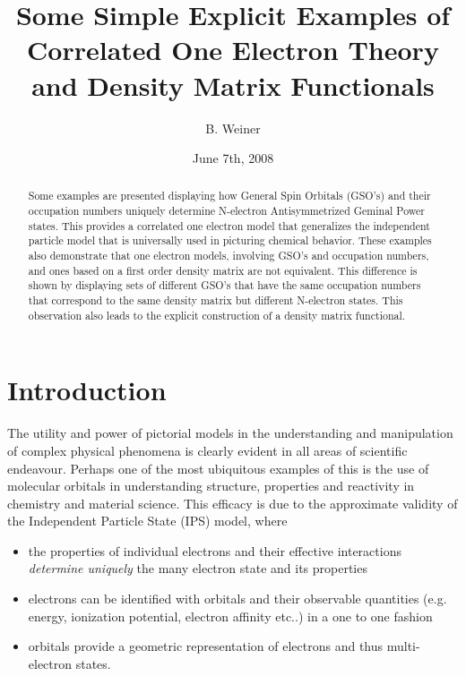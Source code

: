 \documentclass[aps,preprint]{revtex4}%
\begin{document}
\preprint{ }
\title{Some Simple Explicit Examples of Correlated One Electron Theory and Density
Matrix Functionals }
\author{B. Weiner}

\pacs{}

\begin{abstract}
Some examples are presented displaying how General Spin Orbitals (GSO's) and
their occupation numbers uniquely determine N-electron Antisymmetrized Geminal
Power states. This provides a correlated one electron model that generalizes
the independent particle model that is universally used in picturing chemical
behavior. These examples also demonstrate that one electron models, involving
GSO's and occupation numbers, and ones based on a first order density matrix
are not equivalent. This difference is shown by displaying sets of different
GSO's that have the same occupation numbers that correspond to the same
density matrix but different N-electron states. This observation also leads to
the explicit construction of a density matrix functional.

\end{abstract}
\date{June 7th, 2008}
\maketitle


\section{Introduction\label{Intro}}

The utility and power of pictorial models in the understanding and
manipulation of complex physical phenomena is clearly evident in all areas of
scientific endeavour. Perhaps one of the most ubiquitous examples of this is
the use of molecular orbitals in understanding structure, properties and
reactivity in chemistry and material science. This efficacy is due to the
approximate validity of the Independent Particle State (IPS) model, where

\begin{itemize}
\item the properties of individual electrons and their effective interactions
\emph{determine uniquely} the many electron state and its properties

\item electrons can be identified with orbitals and their observable
quantities (e.g. energy, ionization potential, electron affinity etc..) in a
one to one fashion

\item orbitals provide a geometric representation of electrons and thus
multi-electron states.
\end{itemize}
\end{document}
